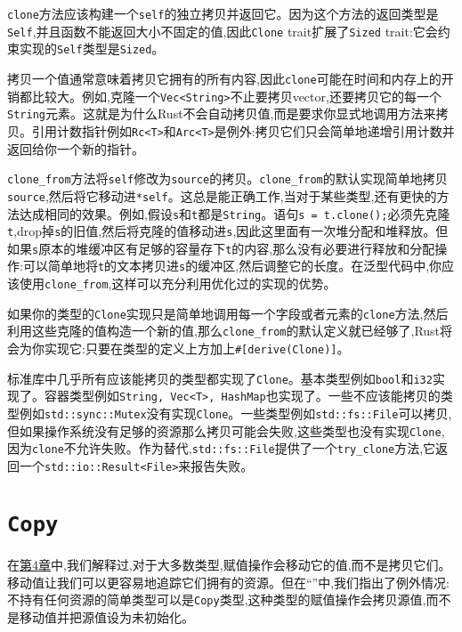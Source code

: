 \texttt{clone}方法应该构建一个\texttt{self}的独立拷贝并返回它。因为这个方法的返回类型是\texttt{Self},并且函数不能返回大小不固定的值,因此\texttt{Clone} trait扩展了\texttt{Sized} trait:它会约束实现的\texttt{Self}类型是\texttt{Sized}。

拷贝一个值通常意味着拷贝它拥有的所有内容,因此\texttt{clone}可能在时间和内存上的开销都比较大。例如,克隆一个\texttt{Vec<String>}不止要拷贝vector,还要拷贝它的每一个\texttt{String}元素。这就是为什么Rust不会自动拷贝值,而是要求你显式地调用方法来拷贝。引用计数指针例如\texttt{Rc<T>}和\texttt{Arc<T>}是例外:拷贝它们只会简单地递增引用计数并返回给你一个新的指针。

\texttt{clone\_from}方法将\texttt{self}修改为\texttt{source}的拷贝。\texttt{clone\_from}的默认实现简单地拷贝\texttt{source},然后将它移动进\texttt{*self}。这总是能正确工作,当对于某些类型,还有更快的方法达成相同的效果。例如,假设\texttt{s}和\texttt{t}都是\texttt{String}。语句\texttt{s = t.clone();}必须先克隆\texttt{t},drop掉\texttt{s}的旧值,然后将克隆的值移动进\texttt{s},因此这里面有一次堆分配和堆释放。但如果\texttt{s}原本的堆缓冲区有足够的容量存下\texttt{t}的内容,那么没有必要进行释放和分配操作:可以简单地将\texttt{t}的文本拷贝进\texttt{s}的缓冲区,然后调整它的长度。在泛型代码中,你应该使用\texttt{clone\_from},这样可以充分利用优化过的实现的优势。

如果你的类型的\texttt{Clone}实现只是简单地调用每一个字段或者元素的\texttt{clone}方法,然后利用这些克隆的值构造一个新的值,那么\texttt{clone\_from}的默认定义就已经够了,Rust将会为你实现它:只要在类型的定义上方加上\texttt{\#[derive(Clone)]}。

标准库中几乎所有应该能拷贝的类型都实现了\texttt{Clone}。基本类型例如\texttt{bool}和\texttt{i32}实现了。容器类型例如\texttt{String, Vec<T>, HashMap}也实现了。一些不应该能拷贝的类型例如\texttt{std::sync::Mutex}没有实现\texttt{Clone}。一些类型例如\texttt{std::fs::File}可以拷贝,但如果操作系统没有足够的资源那么拷贝可能会失败,这些类型也没有实现\texttt{Clone},因为\texttt{clone}不允许失败。作为替代,\texttt{std::fs::File}提供了一个\texttt{try\_clone}方法,它返回一个\texttt{std::io::Result<File>}来报告失败。

\section{\texttt{Copy}}\label{Copy}

在\hyperref[ch04]{第4章}中,我们解释过,对于大多数类型,赋值操作会移动它的值,而不是拷贝它们。移动值让我们可以更容易地追踪它们拥有的资源。但在“”中,我们指出了例外情况:不持有任何资源的简单类型可以是\texttt{Copy}类型,这种类型的赋值操作会拷贝源值,而不是移动值并把源值设为未初始化。

